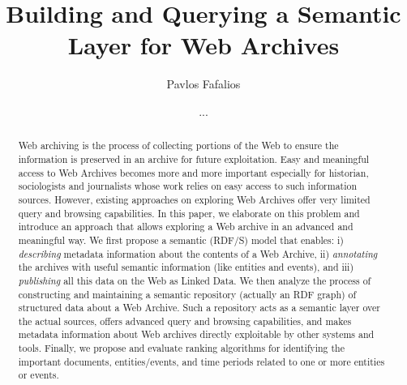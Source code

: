 \documentclass[runningheads,a4paper]{libtex/llncs}
\begin{document}
\title{Building and Querying a Semantic Layer for Web Archives }


\author{Pavlos Fafalios \and ...}
\authorrunning{ }


\maketitle


\begin{abstract}
Web archiving is the process of collecting portions of the Web
to ensure the information is preserved in an archive for future exploitation.
Easy and meaningful access to Web Archives becomes more and more important
especially for historian, sociologists and journalists whose work
relies on easy access to such information sources.
However, existing approaches on exploring Web Archives offer
very limited query and browsing capabilities.
In this paper, we elaborate on this problem and introduce an approach
that allows exploring a Web archive in an advanced and meaningful way.
We first propose a semantic (RDF/S) model that enables:
i) {\em describing} metadata information about the contents of a Web Archive,
ii) {\em annotating} the archives with useful semantic information (like entities and events), and
iii) {\em publishing} all this data on the Web as Linked Data.
We then analyze the process of constructing and maintaining a semantic repository (actually an RDF graph)
of structured data about a Web Archive.
Such a repository acts as a semantic layer over the actual sources,
offers advanced query and browsing capabilities,
and makes metadata information about Web archives
directly exploitable by other systems and tools.
Finally, we propose and evaluate ranking algorithms
for identifying the important documents, entities/events, and time periods
related to one or more entities or events.

\end{abstract}
\end{document}

